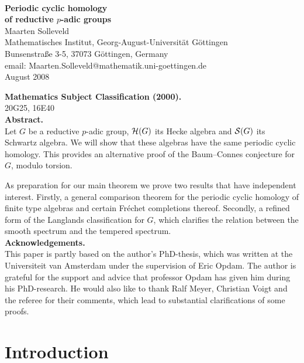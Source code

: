 \ \vspace{1cm}
\begin{center}
\huge \textbf{Periodic cyclic homology\\ of reductive $p$-adic groups}\\[1cm]
\Large Maarten Solleveld\\[3mm]
\normalsize Mathematisches Institut,
Georg-August-Universit\"at G\"ottingen\\
Bunsenstra\ss e 3-5, 37073 G\"ottingen, Germany\\
email: Maarten.Solleveld@mathematik.uni-goettingen.de \\[5mm]
August 2008 \\[3cm]
\end{center}


\begin{minipage}{13cm}
\textbf{Mathematics Subject Classification (2000).} \\
20G25, 16E40 \\[1cm]
\textbf{Abstract.}\\
Let $G$ be a reductive $p$-adic group, $\mathcal H (G)$ its Hecke algebra
and $\mathcal S (G)$ its Schwartz algebra. We will show that these algebras
have the same periodic cyclic homology. This provides an
alternative proof of the Baum--Connes conjecture for $G$, modulo torsion.

As preparation for our main theorem we prove two results that have
independent interest. Firstly, a general comparison theorem for the 
periodic cyclic homology of finite type algebras and
certain Fr\'echet completions thereof. Secondly, a refined form of the 
Langlands classification for $G$, which clarifies the
relation between the smooth spectrum and the tempered spectrum.
\\[1cm]
\textbf{Acknowledgements.}\\
This paper is partly based on the author's PhD-thesis, which was written
at the Universiteit van Amsterdam under the supervision of Eric Opdam. 
The author is grateful for the support and advice that professor Opdam
has given him during his PhD-research.
He would also like to thank Ralf Meyer, Christian Voigt and the referee
for their comments, which lead to substantial clarifications of some proofs.
\end{minipage}


\tableofcontents


\chapter*{Introduction}

